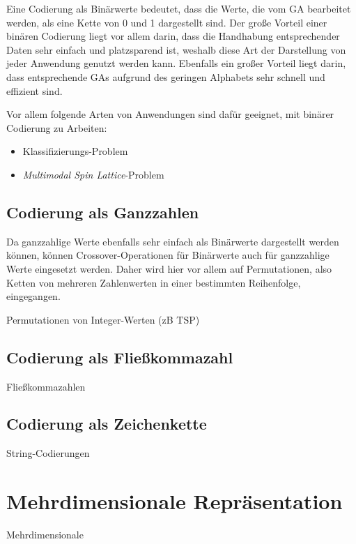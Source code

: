 \documentclass{llncs}
\begin{document}
		Eine Codierung als Binärwerte bedeutet, dass die Werte, die vom GA bearbeitet werden, als eine Kette von 0 und 1 dargestellt sind. Der große Vorteil einer binären Codierung liegt vor allem darin, dass die Handhabung entsprechender Daten sehr einfach und platzsparend ist, weshalb diese Art der Darstellung von jeder Anwendung genutzt werden kann. Ebenfalls ein großer Vorteil liegt darin, dass entsprechende GAs aufgrund des geringen Alphabets sehr schnell und effizient sind.\cite{TacklingRealCodedGA}
		
		Vor allem folgende Arten von Anwendungen sind dafür geeignet, mit binärer Codierung zu Arbeiten:
		\begin{itemize}
			\item Klassifizierungs-Problem
			\item \textit{Multimodal Spin Lattice}-Problem
		\end{itemize}
	
	\subsection{Codierung als Ganzzahlen}
	\label{sec:IntCod}
	
		Da ganzzahlige Werte ebenfalls sehr einfach als Binärwerte dargestellt werden können, können Crossover-Operationen für Binärwerte auch für ganzzahlige Werte eingesetzt werden. Daher wird hier vor allem auf Permutationen, also Ketten von mehreren Zahlenwerten in einer bestimmten Reihenfolge, eingegangen.
		
		Permutationen von Integer-Werten (zB TSP)
	
	\subsection{Codierung als Fließkommazahl}
	\label{sec:FloatCod}
	
		Fließkommazahlen
	
	\subsection{Codierung als Zeichenkette}
	\label{sec:StrCod}
	
		String-Codierungen

\section{Mehrdimensionale Repräsentation}
\label{sec:MehrdimRep}

	Mehrdimensionale
\end{document}
